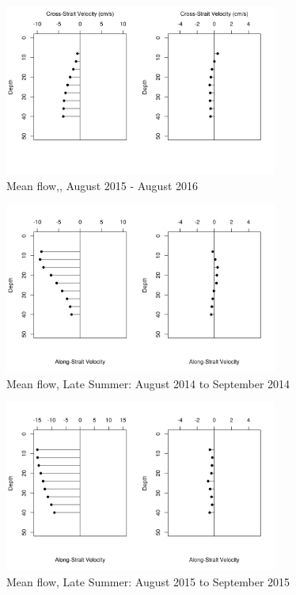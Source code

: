 \documentclass[12pt]{dforeport}
\begin{document}
\begin{figure}  
\centering
\includegraphics[width = 0.8\textwidth]{./figures/37_amf_2015_2016.png}
\caption[Mean flow, 2015-2016]{Mean flow,, August 2015 - August 2016}
\label{f:amf_2015_2016}
\end{figure}


\begin{figure}  
\centering
\includegraphics[width = 0.8\textwidth]{./figures/38_smf_lateSummer_2014.png}
\caption[Mean flow, Late Summer, 2014]{Mean flow, Late Summer: August 2014 to September 2014}
\label{f:smf_ls_2014}
\end{figure}

\begin{figure}  
\centering
\includegraphics[width = 0.8\textwidth]{./figures/39_smf_lateSummer_2015.png}
\caption[Mean flow, Late Summer, 2015]{Mean flow, Late Summer: August 2015 to September 2015}
\label{f:smf_ls_2015}
\end{figure}
\end{document}
